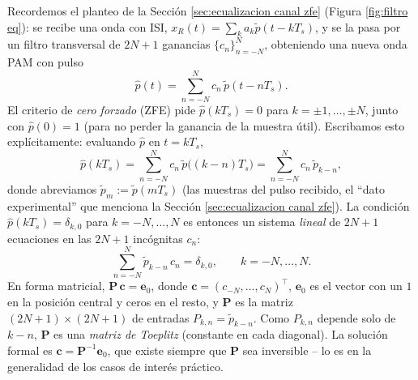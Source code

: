 Recordemos el planteo de la Sección \ref{sec:ecualizacion canal zfe} (Figura \ref{fig:filtro eq}): se recibe una onda con ISI, $x_R(t) = \sum_k a_k \tilde p(t-kT_s)$, y se la pasa por un filtro transversal de $2N+1$ ganancias $\{c_n\}_{n=-N}^N$, obteniendo una nueva onda PAM con pulso
\begin{equation*}
    \hat p(t) = \sum_{n=-N}^N c_n\, \tilde p(t-nT_s).
\end{equation*}
El criterio de \emph{cero forzado} (ZFE) pide $\hat p(kT_s)=0$ para $k=\pm 1,\ldots,\pm N$, junto con $\hat p(0)=1$ (para no perder la ganancia de la muestra útil). Escribamos esto explícitamente: evaluando $\hat p$ en $t=kT_s$,
\begin{equation*}
    \hat p(kT_s) = \sum_{n=-N}^N c_n\, \tilde p\big((k-n)T_s\big) = \sum_{n=-N}^N c_n\, \tilde p_{k-n},
\end{equation*}
donde abreviamos $\tilde p_m := \tilde p(mT_s)$ (las muestras del pulso recibido, el ``dato experimental'' que menciona la Sección \ref{sec:ecualizacion canal zfe}). La condición $\hat p(kT_s)=\delta_{k,0}$ para $k=-N,\ldots,N$ es entonces un sistema \emph{lineal} de $2N+1$ ecuaciones en las $2N+1$ incógnitas $c_n$:
\begin{equation}\label{eq:sistema zfe}
    \sum_{n=-N}^N \tilde p_{k-n}\, c_n = \delta_{k,0}, \qquad k=-N,\ldots,N.
\end{equation}
En forma matricial, $\mathbf P\,\mathbf c = \mathbf e_0$, donde $\mathbf c=(c_{-N},\ldots,c_N)^\top$, $\mathbf e_0$ es el vector con un $1$ en la posición central y ceros en el resto, y $\mathbf P$ es la matriz $(2N+1)\times(2N+1)$ de entradas $P_{k,n}=\tilde p_{k-n}$. Como $P_{k,n}$ depende solo de $k-n$, $\mathbf P$ es una \emph{matriz de Toeplitz} (constante en cada diagonal). La solución formal es $\mathbf c = \mathbf P^{-1}\mathbf e_0$, que existe siempre que $\mathbf P$ sea inversible -- lo es en la generalidad de los casos de interés práctico.

